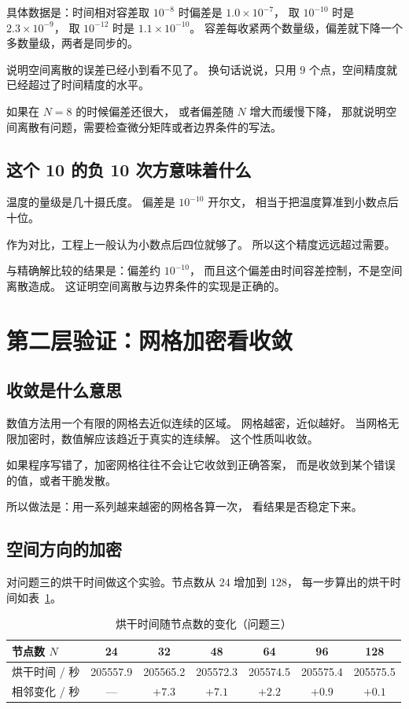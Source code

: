具体数据是：时间相对容差取 $10^{-8}$ 时偏差是 $1.0\times10^{-7}$，
取 $10^{-10}$ 时是 $2.3\times10^{-9}$，
取 $10^{-12}$ 时是 $1.1\times10^{-10}$。
容差每收紧两个数量级，偏差就下降一个多数量级，两者是同步的。

说明空间离散的误差已经小到看不见了。
换句话说说，只用 $9$ 个点，空间精度就已经超过了时间精度的水平。

如果在 $N=8$ 的时候偏差还很大，
或者偏差随 $N$ 增大而缓慢下降，
那就说明空间离散有问题，需要检查微分矩阵或者边界条件的写法。

\subsection{这个 10 的负 10 次方意味着什么}

温度的量级是几十摄氏度。
偏差是 $10^{-10}$ 开尔文，
相当于把温度算准到小数点后十位。

作为对比，工程上一般认为小数点后四位就够了。
所以这个精度远远超过需要。

\keypoint
与精确解比较的结果是：偏差约 $10^{-10}$，
而且这个偏差由时间容差控制，不是空间离散造成。
这证明空间离散与边界条件的实现是正确的。

\section{第二层验证：网格加密看收敛}

\subsection{收敛是什么意思}

数值方法用一个有限的网格去近似连续的区域。
网格越密，近似越好。
当网格无限加密时，数值解应该趋近于真实的连续解。
这个性质叫收敛。

如果程序写错了，加密网格往往不会让它收敛到正确答案，
而是收敛到某个错误的值，或者干脆发散。

所以做法是：用一系列越来越密的网格各算一次，
看结果是否稳定下来。

\subsection{空间方向的加密}

对问题三的烘干时间做这个实验。节点数从 $24$ 增加到 $128$，
每一步算出的烘干时间如表~\ref{tab:verify2}。

\begin{table}[H]
\centering
\small
\caption{烘干时间随节点数的变化（问题三）}
\label{tab:verify2}
\begin{tabular}{@{}lcccccc@{}}
\toprule
节点数 $N$ & 24 & 32 & 48 & 64 & 96 & 128 \\
\midrule
烘干时间 / 秒 & 205557.9 & 205565.2 & 205572.3 & 205574.5 & 205575.4 & 205575.5 \\
相邻变化 / 秒 & --- & $+7.3$ & $+7.1$ & $+2.2$ & $+0.9$ & $+0.1$ \\
\bottomrule
\end{tabular}
\end{table}

